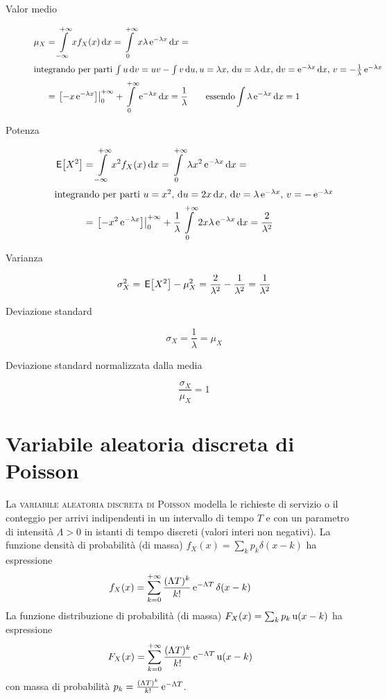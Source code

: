 \begin{description}
\item[Valor medio]
\begin{equation}
\begin{split}
	\mu_X&=\intinf{x f_X(x)}{x}=\intd{0}{+\infty}{x \lambda\e{-\lambda x}}{x}=\\
\intertext{integrando per parti $\int{u \diff v}=u v-\int{v\diff u}, u=\lambda x$, $\diff u=\lambda\diff x$, $\diff v=\e{-\lambda x}\diff x$, $v=-\frac{1}{\lambda}\e{-\lambda x}$}
	&=\bound{0}{+\infty}{-x\e{-\lambda x}}+\intd{0}{+\infty}{\e{-\lambda x}}{x}=\frac{1}{\lambda} 	\qquad\text{essendo} \int\lambda\e{-\lambda x}\diff x=1
\end{split}
\end{equation}
\item[Potenza]
\begin{equation}
\begin{split}
	\E{X^2}&=\intinf{x^2 f_X(x)}{x}=\intd{0}{+\infty}{\lambda x^2\e{-\lambda x}}{x}=\\
\intertext{integrando per parti $u=x^2$, $\diff u=2x\diff x$, $\diff v=\lambda\e{-\lambda x}$, $v=-\e{-\lambda x}$}
	&=\bound{0}{+\infty}{-x^2\e{-\lambda x}}+\frac{1}{\lambda}\intd{0}{+\infty}{2x \lambda\e{-\lambda x}}{x}=\frac{2}{\lambda^2}
\end{split}
\end{equation}
\item[Varianza]
\[
	\sigma^2_X=\E{X^2}-\mu^2_X=\frac{2}{\lambda^2}-\frac{1}{\lambda^2}=\frac{1}{\lambda^2}
\]
\item[Deviazione standard]
\[
	\sigma_X=\frac{1}{\lambda}=\mu_X
\]
\item[Deviazione standard normalizzata dalla media] \[
	\frac{\sigma_X}{\mu_X}=1
\]
\end{description}

\section{Variabile aleatoria discreta di Poisson}
La \textsc{variabile aleatoria discreta di Poisson} modella le richieste di servizio o il conteggio per arrivi indipendenti in un intervallo di tempo $T$ e con un parametro di intensità $\Lambda>0$ in istanti di tempo discreti (valori interi non negativi). La funzione densità di probabilità (di massa) $f_X(x)=\sum_k p_k \delta(x-k)$ ha espressione
\begin{equation}
	f_X(x)=\sum_{k=0}^{+\infty}{\frac{(\Lambda T)^k}{k!}\e{-\Lambda T}\delta(x-k)}
\end{equation}
La funzione distribuzione di probabilità (di massa) $F_X(x)=\sum_k p_k \step(x-k)$ ha espressione
\begin{equation}
	F_X(x)=\sum_{k=0}^{+\infty}{\frac{(\Lambda T)^k}{k!}\e{-\Lambda T}\step(x-k)}
\end{equation}
con massa di probabilità $p_k=\frac{(\Lambda T)^k}{k!}\e{-\Lambda T}$.

